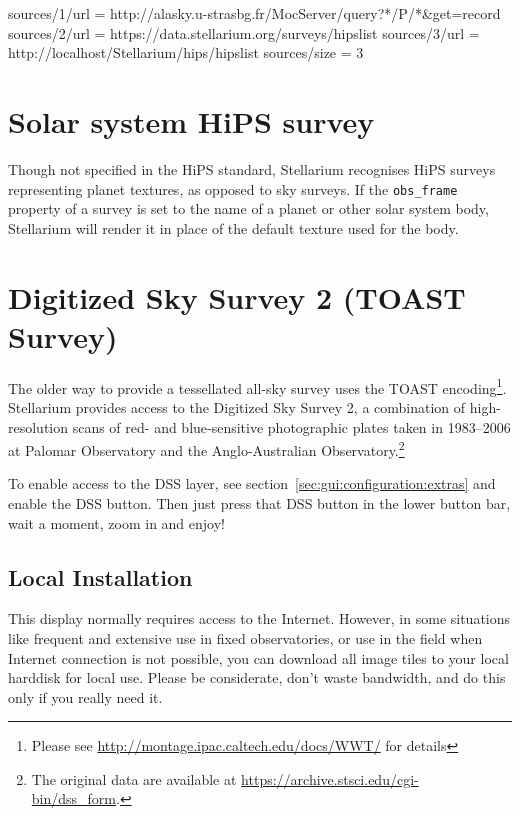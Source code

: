 \begin{configfile}[\scriptsize]
[hips]
sources/1/url = http://alasky.u-strasbg.fr/MocServer/query?*/P/*&get=record
sources/2/url = https://data.stellarium.org/surveys/hipslist
sources/3/url = http://localhost/Stellarium/hips/hipslist
sources/size  = 3
\end{configfile}

\section{Solar system HiPS survey}

Though not specified in the HiPS standard, Stellarium recognises HiPS surveys
representing planet textures, as opposed to sky surveys.  If the
\texttt{obs\_frame} property of a survey is set to the name of a planet or
other solar system body, Stellarium will render it in place of the default
texture used for the body.


\section{Digitized Sky Survey 2 (TOAST Survey)}
\label{sec:TOAST}

The older way to provide a tessellated all-sky survey uses the TOAST
encoding\footnote{Please see
  \url{http://montage.ipac.caltech.edu/docs/WWT/} for details}.
Stellarium provides access to the Digitized Sky Survey 2, a
combination of high-resolution scans of red- and blue-sensitive
photographic plates taken in 1983--2006 at Palomar Observatory and the
Anglo-Australian Observatory.\footnote{The original data are available
  at \url{https://archive.stsci.edu/cgi-bin/dss_form}.}

To enable access to the DSS layer, see
section~\ref{sec:gui:configuration:extras} and enable the DSS
button. Then just press that DSS button in the lower button bar, wait
a moment, zoom in and enjoy!

\subsection{Local Installation}

This display normally requires access to the Internet. However, in
some situations like frequent and extensive use in fixed observatories,
or use in the field when Internet connection is not possible, you can
download all image tiles to your local harddisk for local use. Please be
considerate, don't waste bandwidth, and do this only if you really need it.

